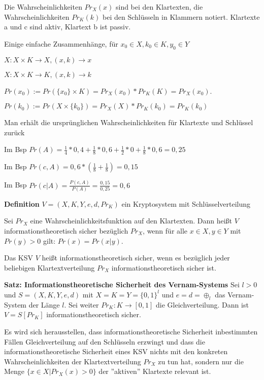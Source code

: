 \documentclass[a4paper]{article}
\begin{document}
\begin{multicols}{3}
    Die Wahrscheinlichkeiten $Pr_X(x)$ sind bei den Klartexten, die Wahrscheinlichkeiten $Pr_K(k)$ bei den Schlüsseln in Klammern notiert. Klartexte a und c sind aktiv, Klartext b ist passiv.

    Einige einfache Zusammenhänge, für $x_0\in X,k_0\in K,y_0\in Y$
    \begin{itemize*}
        \item $X: X\times K \rightarrow X, (x,k)\rightarrow x$
        \item $X: X\times K \rightarrow K, (x,k)\rightarrow k$
        \item $Pr(x_0):=Pr(\{x_0\}\times K) = Pr_X(x_0)*Pr_K(K) = Pr_X(x_0)$.
        \item $Pr(k_0):=Pr(X\times\{k_0\})=Pr_X(X)*Pr_K(k_0)=Pr_K(k_0)$
        \item Man erhält die ursprünglichen Wahrscheinlichkeiten für Klartexte und Schlüssel zurück
        \item Im Bsp $Pr(A)=\frac{1}{4}*0,4+ \frac{1}{8}*0,6 +\frac{1}{2}*0 +\frac{1}{8}* 0,6=0,25$
        \item Im Bsp $Pr(c,A)=0,6*(\frac{1}{8}+\frac{1}{8})=0,15$
        \item Im Bsp $Pr(c|A)=\frac{P(c,A)}{P(A)}=\frac{0,15}{0,25}=0,6$
    \end{itemize*}

    \textbf{Definition} $V=(X,K,Y,e,d,Pr_K)$ ein Kryptosystem mit Schlüsselverteilung
    \begin{enumerate*}
        \item Sei $Pr_X$ eine Wahrscheinlichkeitsfunktion auf den Klartexten. Dann heißt $V$ informationstheoretisch sicher bezüglich $Pr_X$, wenn für alle $x\in X,y\in Y$ mit $Pr(y)>0$ gilt: $Pr(x) = Pr(x|y)$.
        \item Das KSV $V$ heißt informationstheoretisch sicher, wenn es bezüglich jeder beliebigen Klartextverteilung $Pr_X$ informationstheoretisch sicher ist.
    \end{enumerate*}

    \textbf{Satz: Informationstheoretische Sicherheit des Vernam-Systems} Sei $l>0$ und $S=(X,K,Y,e,d)$ mit $X=K=Y=\{0,1\}^l$ und $e=d=\oplus_l$ das Vernam-System der Länge $l$. Sei weiter $Pr_K:K\rightarrow [0,1]$ die Gleichverteilung. Dann ist $V=S[Pr_K]$ informationstheoretisch sicher.

    Es wird sich herausstellen, dass informationstheoretische Sicherheit inbestimmten Fällen Gleichverteilung auf den Schlüsseln erzwingt und dass die informationstheoretische Sicherheit eines KSV nichts mit den konkreten Wahrscheinlichkeiten der Klartextverteilung $Pr_X$ zu tun hat, sondern nur die Menge $\{x\in X|Pr_X(x)> 0\}$ der ''aktiven'' Klartexte relevant ist.


\end{multicols}
\end{document}
